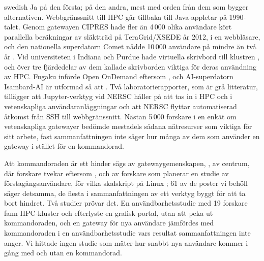 \begin{onlyin}{swedish}
Ja på den första; på den andra, mest med orden från dem som bygger
alternativen.  Webbgränssnitt till HPC går tillbaka till Java-appletar på
1990-talet\autocite{Calegari2019Portals}.  Genom gatewayen CIPRES hade
fler än 4\,000 olika användare kört parallella beräkningar av släktträd
på TeraGrid/XSEDE år 2012\autocite{Miller2012CIPRES}, i en webbläsare,
och den nationella superdatorn Comet nådde 10\,000 användare på mindre
än två år
.  Vid universiteten i Indiana och Purdue hade virtuella
skrivbord till klustren
, och över tre fjärdedelar av dem kallade
skrivborden viktiga för deras användning av
HPC\autocite{Thota2019Desktops}.  Fugaku införde Open OnDemand eftersom
, och AI-superdatorn Isambard-AI är utformad så att
.  Två laboratorierapporter, som är grå litteratur,
tillägger att Jupyter-verktyg vid NERSC håller på att tas in i HPC och i
vetenskapliga användaranläggningar\autocite{Paine2020Jupyter} och att
NERSC flyttar automatiserad åtkomst från
SSH till webbgränssnitt\autocite{Majumder2026HEPCloud}.  Nästan 5\,000
forskare i en enkät om vetenskapliga gatewayer bedömde mestadels sådana
nätresurser som viktiga för sitt arbete\autocite{Lawrence2015Gateways},
fast sammanfattningen inte säger hur många av dem som använder en
gateway i stället för en kommandorad.

Att kommandoraden är ett hinder sägs av gatewaygemenskapen,
,
av centrum, där forskare tvekar eftersom
, och av
forskare som planerar en studie av förstagångsanvändare, för vilka
skalskript på Linux
; 61 av de poster vi behöll säger detsamma,
de flesta i sammanfattningen av ett verktyg byggt för att ta bort
hindret.  Två studier prövar det.  En användbarhetsstudie med 19
forskare fann HPC-kluster
 och efterlyste en grafisk portal, utan att peka ut kommandoraden,
och en gateway för nya användare jämfördes med kommandoraden i en
användbarhetsstudie vars resultat sammanfattningen inte
anger\autocite{Sampedro2017Sandstone}.  Vi hittade ingen studie som mäter
hur snabbt nya användare kommer i gång med och utan en kommandorad.
\end{onlyin}

